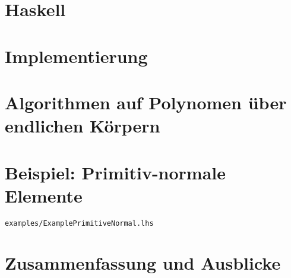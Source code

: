 \documentclass[ngerman
  ,fontsize=11pt %
  ,numbers=noenddot %
  ,parskip=half*
  ,openany
  ,DIV=10
  ,fleqn %
  ,oneside
  ,DIV=10
]{./myClass}
\begin{document}
\ifnum{}
  \frontmatter
  
  \newpage \thispagestyle{empty} \mbox{}
\else
  \mainmatter
\fi

\tableofcontents{}


\ifnum{}
  \mainmatter
\fi

%

\chapter{Haskell}


\chapter{Implementierung}








\chapter{Algorithmen auf Polynomen über endlichen Körpern}
\label{chap:algs}





%
\chapter{Beispiel: Primitiv-normale Elemente}
\label{chap:bsp-prim-norm}
\texttt{examples/ExamplePrimitiveNormal.lhs}




\chapter{Zusammenfassung und Ausblicke}


\pagebreak
\appendix
{}



\pagebreak
\printbibliography

\appendix
{}



\end{document}
